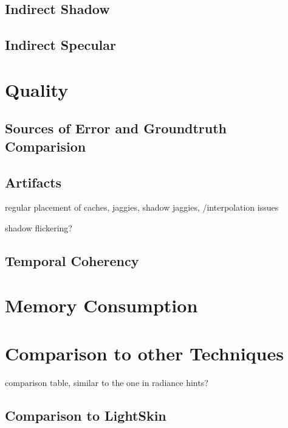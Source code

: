 \documentclass[thesis.tex]{subfiles}
\begin{document}
\subsection{Indirect Shadow}


\subsection{Indirect Specular}

\newpage

\section{Quality}

\subsection{Sources of Error and Groundtruth Comparision}

\subsection{Artifacts}
regular placement of caches, jaggies,
shadow jaggies,
/interpolation issues

shadow flickering?

\subsection{Temporal Coherency}


\section{Memory Consumption}

\section{Comparison to other Techniques} \label{sec:eva:comparisiontoother}

comparison table, similar to the one in radiance hints?

\subsection{Comparison to LightSkin}

\subfilebib %
\end{document}
